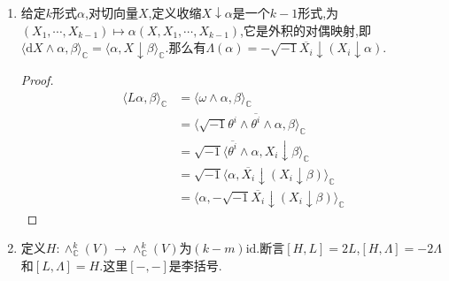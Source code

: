 \begin{enumerate}
    
    \item 给定$k$形式$\alpha$,对切向量$X$,定义收缩$X\downarrow\alpha$是一个$k-1$形式,为$(X_1,\cdots,X_{k-1})\mapsto\alpha(X,X_1,\cdots,X_{k-1})$,它是外积的对偶映射,即$\langle \mathrm{d}X\wedge\alpha,\beta\rangle_{\mathbb{C}}=\langle\alpha,X\downarrow\beta\rangle_{\mathbb{C}}$.那么有$\Lambda(\alpha)=-\sqrt{-1}\overline{X_i}\downarrow(X_i\downarrow\alpha)$.
    \begin{proof}
    	\begin{align*}
    		\langle L\alpha,\beta\rangle_{\mathbb{C}}&=\langle\omega\wedge\alpha,\beta\rangle_{\mathbb{C}}\\&=\langle\sqrt{-1}\theta^i\wedge\overline{\theta^i}\wedge\alpha,\beta\rangle_{\mathbb{C}}\\&=\sqrt{-1}\langle\overline{\theta^i}\wedge\alpha,X_i\downarrow\beta\rangle_{\mathbb{C}}\\&=\sqrt{-1}\langle\alpha,\overline{X_i}\downarrow(X_i\downarrow\beta)\rangle_{\mathbb{C}}\\&=\langle\alpha,-\sqrt{-1}\overline{X_i}\downarrow(X_i\downarrow\beta)\rangle_{\mathbb{C}}
    	\end{align*}
    \end{proof}
    \item 定义$H:\wedge_{\mathbb{C}}^k(V)\to\wedge_{\mathbb{C}}^k(V)$为$(k-m)\mathrm{id}$.断言$[H,L]=2L$,$[H,\Lambda]=-2\Lambda$和$[L,\Lambda]=H$.这里$[-,-]$是李括号.
\end{enumerate}

